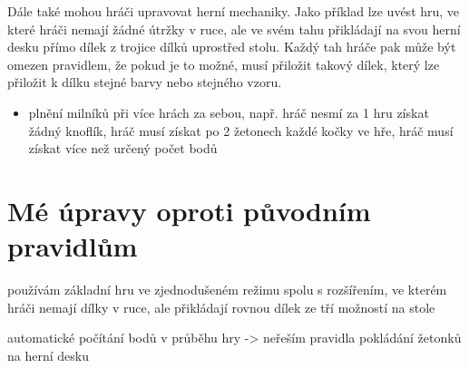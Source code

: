 Dále také mohou hráči upravovat herní mechaniky. Jako příklad lze uvést hru, ve které hráči nemají žádné útržky v ruce, ale ve svém tahu přikládají na svou herní desku přímo dílek z trojice dílků uprostřed stolu. Každý tah hráče pak může být omezen pravidlem, že pokud je to možné, musí přiložit takový dílek, který lze přiložit k dílku stejné barvy nebo stejného vzoru.

\begin{itemize}
    \item plnění milníků při více hrách za sebou, např. hráč nesmí za 1 hru získat žádný knoflík, hráč musí získat po 2 žetonech každé kočky ve hře, hráč musí získat více než určený počet bodů
\end{itemize}

\section{Mé úpravy oproti původním pravidlům}

používám základní hru ve zjednodušeném režimu spolu s rozšířením, ve kterém hráči nemají dílky v ruce, ale přikládají rovnou dílek ze tří možností na stole

automatické počítání bodů v průběhu hry -> neřeším pravidla pokládání žetonků na herní desku

